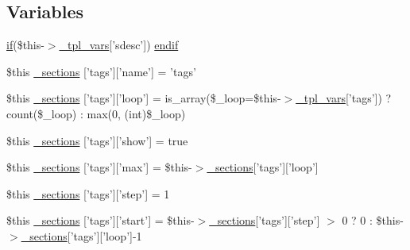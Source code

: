 \subsection*{\-Variables}
\begin{DoxyCompactItemize}
\item 
\hyperlink{_setup_8inc_8php_ad0184337b31d13763ec8751feff4aabe}{if}(\$this-\/$>$\hyperlink{_06_06127_05_06_0612781687_05pkgelementindex_8tpl_8php_a4a4846d8e68d455590131a05697f67a3}{\-\_\-tpl\-\_\-vars}\mbox{[}'sdesc'\mbox{]}) \hyperlink{default_234d6fa4bfd5eef6424a9ddc74a166350_2_06_06972_05_06_06972954595_05docblock_8tpl_8php_a82cd33ca97ff99f2fcc5e9c81d65251b}{endif}
\item 
\$this \hyperlink{default_234d6fa4bfd5eef6424a9ddc74a166350_2_06_06972_05_06_06972954595_05docblock_8tpl_8php_aa1e572bb7d05e8a2142a85be7b8a87b5}{\-\_\-sections} \mbox{[}'tags'\mbox{]}\mbox{[}'name'\mbox{]} = 'tags'
\item 
\$this \hyperlink{default_234d6fa4bfd5eef6424a9ddc74a166350_2_06_06972_05_06_06972954595_05docblock_8tpl_8php_a410d383544f232c66ea48cc29cdc5bfa}{\-\_\-sections} \mbox{[}'tags'\mbox{]}\mbox{[}'loop'\mbox{]} = is\-\_\-array(\$\-\_\-loop=\$this-\/$>$\hyperlink{_06_06127_05_06_0612781687_05pkgelementindex_8tpl_8php_a4a4846d8e68d455590131a05697f67a3}{\-\_\-tpl\-\_\-vars}\mbox{[}'tags'\mbox{]}) ? count(\$\-\_\-loop) \-: max(0, (int)\$\-\_\-loop)
\item 
\$this \hyperlink{default_234d6fa4bfd5eef6424a9ddc74a166350_2_06_06972_05_06_06972954595_05docblock_8tpl_8php_ac42ff4c76eabf3cabe7157d354e07ad8}{\-\_\-sections} \mbox{[}'tags'\mbox{]}\mbox{[}'show'\mbox{]} = true
\item 
\$this \hyperlink{default_234d6fa4bfd5eef6424a9ddc74a166350_2_06_06972_05_06_06972954595_05docblock_8tpl_8php_acf5abc1846c453fa04864a654b69ce2c}{\-\_\-sections} \mbox{[}'tags'\mbox{]}\mbox{[}'max'\mbox{]} = \$this-\/$>$\hyperlink{_06_06127_05_06_0612781687_05pkgelementindex_8tpl_8php_a9e3d26b39edfe29c3f29b8035ef33828}{\-\_\-sections}\mbox{[}'tags'\mbox{]}\mbox{[}'loop'\mbox{]}
\item 
\$this \hyperlink{default_234d6fa4bfd5eef6424a9ddc74a166350_2_06_06972_05_06_06972954595_05docblock_8tpl_8php_a47209f3eb9ee860dbeacf69dc38f5e5a}{\-\_\-sections} \mbox{[}'tags'\mbox{]}\mbox{[}'step'\mbox{]} = 1
\item 
\$this \hyperlink{default_234d6fa4bfd5eef6424a9ddc74a166350_2_06_06972_05_06_06972954595_05docblock_8tpl_8php_a7f087a93e0a027583a7dd0699bce1b9d}{\-\_\-sections} \mbox{[}'tags'\mbox{]}\mbox{[}'start'\mbox{]} = \$this-\/$>$\hyperlink{_06_06127_05_06_0612781687_05pkgelementindex_8tpl_8php_a9e3d26b39edfe29c3f29b8035ef33828}{\-\_\-sections}\mbox{[}'tags'\mbox{]}\mbox{[}'step'\mbox{]} $>$ 0 ? 0 \-: \$this-\/$>$\hyperlink{_06_06127_05_06_0612781687_05pkgelementindex_8tpl_8php_a9e3d26b39edfe29c3f29b8035ef33828}{\-\_\-sections}\mbox{[}'tags'\mbox{]}\mbox{[}'loop'\mbox{]}-\/1

\end{DoxyCompactItemize}
